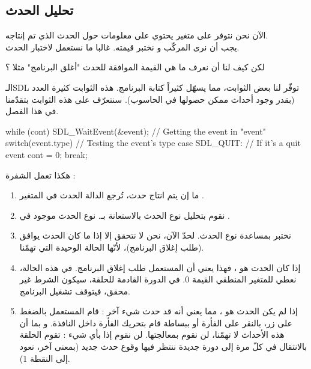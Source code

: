 \subsection{تحليل الحدث}

الآن نحن نتوفر على متغير
يحتوي على معلومات حول الحدث الذي تم إنتاجه.\\
يجب أن نرى المركّب
و نختبر قيمته. غالبا ما نستعمل
لاختبار الحدث.

\begin{question}
لكن كيف لنا أن نعرف ما هي القيمة الموافقة للحدث "أغلق البرنامج" مثلا ؟
\end{question}

الـ\textenglish{SDL}
توفّر لنا بعض الثوابت، مما يسهّل كثيراً كتابة البرنامج. هذه الثوابت كثيرة العدد (بقدر وجود أحداث ممكن حصولها في الحاسوب). سنتعرّف على هذه الثوابت بتقدّمنا في هذا الفصل.

\begin{Csource}
while (cont)
{
	SDL_WaitEvent(&event); // Getting the event in "event"
	switch(event.type) // Testing the event's type
	{
		case SDL_QUIT: // If it's a quit event
		cont = 0;
		break;
	}
}
\end{Csource}

هكذا تعمل الشفرة :

\begin{enumerate}
	\item ما إن يتم انتاج حدث، تُرجع الدالة 
	الحدث في المتغير 
	.
	\item نقوم بتحليل نوع الحدث بالاستعانة بـ.
	نوع الحدث موجود في
	.
	\item نختبر بمساعدة 
	نوع الحدث. لحدّ الآن، نحن لا نتحقق إلا إذا ما كان الحدث يوافق
	(طلب إغلاق البرنامج)، لأنّها الحالة الوحيدة التي تهمّنا.
	\item إذا كان الحدث هو 
	،
	فهذا يعني أن المستعمل طلب إغلاق البرنامج. في هذه الحالة، نعطي للمتغير المنطقي
	القيمة 0. في الدورة القادمة للحلقة، سيكون الشرط غير محقق، فيتوقف تشغيل البرنامج.
	\item إذا لم يكن الحدث هو 
	،
	مما يعني أنه قد حدث شيء آخر : قام المستعمل بالضغط على زر، بالنقر على الفأرة أو ببساطة قام بتحريك الفأرة داخل النافذة. و بما أن هذه الأحداث لا تهمّنا، لن نقوم بمعالجتها. لن نقوم إذا بأي شيء : تقوم الحلقة بالانتقال في كلّ مرة إلى دورة جديدة ننتظر فيها وقوع حدث جديد (بمعنى آخر، نعود إلى النقطة 1).
\end{enumerate}

